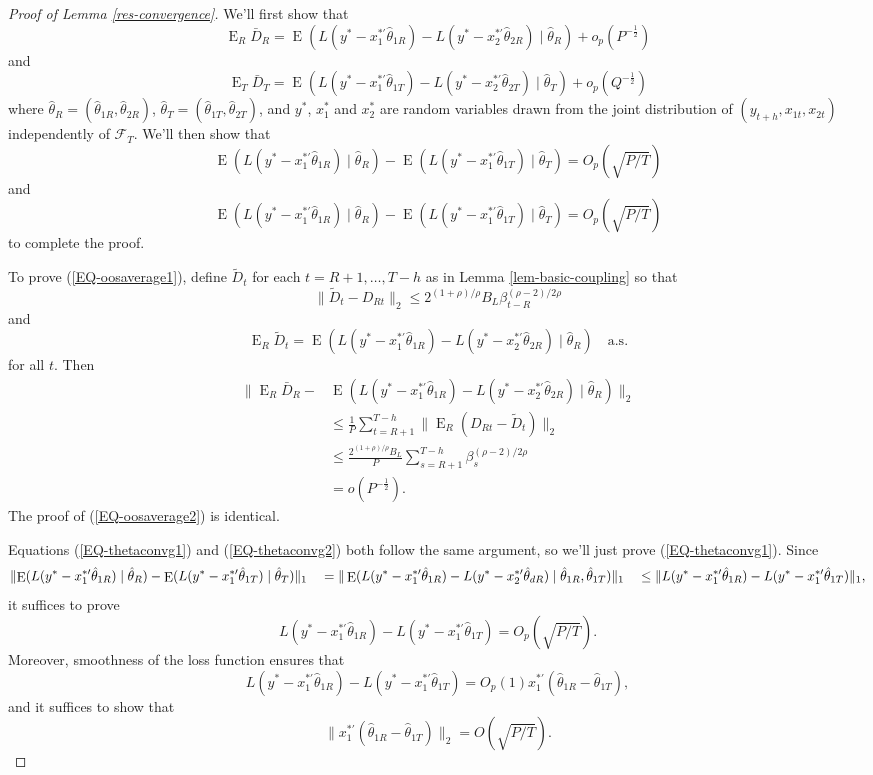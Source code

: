 \documentclass[11pt]{article}
\DeclareMathOperator{\E}{E}
\newcommand{\oosA}{\bar{D}_{R}}
\newcommand{\oosB}{\bar{D}_{T}}
\newcommand{\oosSum}[2]{\ensuremath{\sum_{#1=R+#2}^{T-\h}}}
\newcommand{\h}{h}
\newcommand{\couplingConstant}{\ensuremath{2^{(1+\rho)/\rho} B_L}}
\newcommand{\couplingBeta}[1]{\ensuremath{\beta^{(\rho-2)/2\rho}_{#1}}}
\newcommand{\couplingBound}[1]{\couplingConstant \couplingBeta{#1}}
\newcommand{\bh}[1]{\ensuremath{\hat\theta_{#1}}}
\begin{document}
\begin{proof}[Proof of Lemma \ref{res-convergence}]
\newcommand{\resConvgRHS}[1]{\ensuremath{\E(L(y^* - x_1^{*\prime}\bh{1#1}) - L(y^{*} -
x_2^{*\prime}\bh{2#1}) \mid \bh{#1})}}
\newcommand{\resConvgEstDiff}[1]{\ensuremath{\E(L(y^{*} -
    x_{#1}^{*\prime}\bh{#1R}) \mid \bh{R}) - 
\E(L(y^{*} - x_{#1}^{*\prime}\bh{#1T}) \mid \bh{T})}}
\newcommand{\resConvgEstDiffRV}[1]{\ensuremath{L(y^{*} -
    x_{#1}^{*\prime}\bh{#1R}) - L(y^{*} - x_{#1}^{*\prime}\bh{#1T})}}
We'll first show that 
\begin{equation}\label{EQ-oosaverage1}
\E_R \oosA = \resConvgRHS{R} + o_p(P^{-\frac12})
\end{equation}
and
\begin{equation}\label{EQ-oosaverage2}
\E_T \oosB = \resConvgRHS{T} + o_p(Q^{-\frac12})
\end{equation}
where $\hat\theta_R = (\hat\theta_{1R}, \hat\theta_{2R})$,
$\hat\theta_T = (\hat\theta_{1T}, \hat\theta_{2T})$, and $y^{*}$,
$x_1^{*}$ and $x_2^{*}$ are random variables drawn from the joint
distribution of $(y_{t+\h},x_{1t},x_{2t})$ independently of
$\mathcal{F}_T$.  We'll then show that
\begin{equation}\label{EQ-thetaconvg1}
\resConvgEstDiff{1} = O_p(\sqrt{P/T})
\end{equation}
and
\begin{equation}\label{EQ-thetaconvg2}
\resConvgEstDiff{1} = O_p(\sqrt{P/T})
\end{equation}
to complete the proof.

To prove (\ref{EQ-oosaverage1}), define $\tilde D_t$ for each $t = R+1,\dots,T-\h$ as
in Lemma \ref{lem-basic-coupling} so that
\[
\lVert \tilde D_t - D_{Rt} \rVert_2 \leq \couplingBound{t-R}
\]
and 
\[
\E_R \tilde D_t = \resConvgRHS{R} \quad\text{a.s.}
\]
for all $t$.  Then 
\begin{align*}
\lVert \E_R \oosA - & \resConvgRHS{R} \rVert_2  \\
& \leq \frac1P \oosSum{t}{1} \lVert \E_R (D_{Rt} - \tilde D_t) \rVert_2 \\
& \leq \frac{\couplingConstant}{P} \oosSum{s}{1} \couplingBeta{s} \\
& = o(P^{-\frac12}).
\end{align*}
The proof of (\ref{EQ-oosaverage2}) is identical.

Equations (\ref{EQ-thetaconvg1}) and (\ref{EQ-thetaconvg2}) both
follow the same argument, so we'll just prove (\ref{EQ-thetaconvg1}).
Since 
\[ \lVert \resConvgEstDiff{1} \rVert_1 \\ \quad= \| \E(L(y^{*} -
x_1^{*\prime} \hat{\theta}_{1R}) - L(y^{*} - x_2^{*\prime}
\hat{\theta}_{dR}) \mid \hat{\theta}_{1R}, \hat{\theta}_{1T}) \|_1 \\
\quad\leq \lVert \resConvgEstDiffRV{1} \rVert_1, \] it suffices to
prove
\[ \resConvgEstDiffRV{1} = O_p(\sqrt{P/T}). \]
Moreover, smoothness of the loss function ensures that
\[ \resConvgEstDiffRV{1} = O_p(1) x_1^{*\prime} (\bh{1R} -
\bh{1T}), \]
and it suffices to show that
\begin{equation*}
  \lVert x_1^{*\prime}(\bh{1R} - \bh{1T}) \rVert_2 = O(\sqrt{P/T}).
\end{equation*}


\end{proof}
\end{document}
